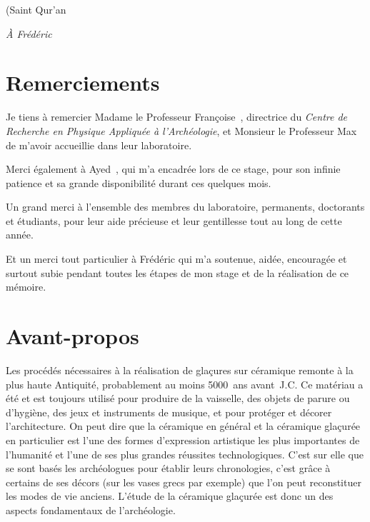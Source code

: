 \clearpage

\begin{RaggedLeft}
  \itshape

  (Saint Qur'an
\end{RaggedLeft}


{\raggedleft\itshape À Frédéric \par}


\chapter*{Remerciements}

Je tiens à remercier Madame le Professeur Françoise~, 
directrice du \emph{Centre de Recherche en Physique Appliquée à 
l'Archéologie}, et Monsieur le Professeur Max~ 
de m'avoir accueillie dans leur laboratoire.

\bigskip

Merci également à Ayed~, qui m'a encadrée lors de ce 
stage, pour son infinie patience et sa grande disponibilité durant 
ces quelques mois.

\bigskip

Un grand merci à l'ensemble des membres du laboratoire, permanents, 
doctorants et étudiants, pour leur aide précieuse et leur gentillesse 
tout au long de cette année.

\bigskip

Et un merci tout particulier à Frédéric qui m'a soutenue, aidée, 
encouragée et surtout subie pendant toutes les étapes de mon stage 
et de la réalisation de ce mémoire.

\chapter*{Avant-propos}

Les procédés nécessaires à la réalisation de glaçures sur céramique 
remonte à la plus haute Antiquité, probablement au moins 
\num{5000}~ans avant~J.C. Ce matériau a été et est toujours utilisé 
pour produire de la vaisselle, des objets de parure ou d'hygiène, 
des jeux et instruments de musique, et pour protéger et décorer 
l'architecture. On peut dire que la céramique en général et la 
céramique glaçurée en particulier est l'une des formes d'expression 
artistique les plus importantes de l'humanité et l'une de ses plus 
grandes réussites technologiques. C'est sur elle que se sont basés les 
archéologues pour établir leurs chronologies, c'est grâce à certains 
de ses décors (sur les vases grecs par exemple) que l'on peut 
reconstituer les modes de vie anciens. L'étude de la céramique 
glaçurée est donc un des aspects fondamentaux de l'archéologie.

